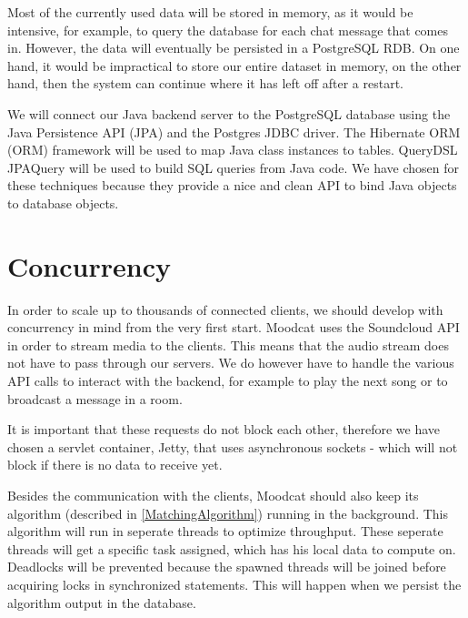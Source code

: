 \par
Most of the currently used data will be stored in memory, as it would be intensive, for example, to query the database for each chat message that comes in.
However, the data will eventually be persisted in a PostgreSQL\cite{PostgreSQL} \gls{RDB}.
On one hand, it would be impractical to store our entire dataset in memory, on the other hand, then the system can continue where it has left off after a restart.

\par
We will connect our Java backend server to the PostgreSQL database using the Java Persistence API (JPA) and the Postgres JDBC driver.
The Hibernate\cite{HibernateORM} \Gls{ORM} (ORM) framework will be used to map Java class instances to tables.
QueryDSL\cite{QueryDSL} JPAQuery will be used to build \Gls{SQL} queries from Java code.
We have chosen for these techniques because they provide a nice and clean API to bind Java objects to database objects.

\section{Concurrency}
In order to scale up to thousands of connected clients, we should develop with concurrency in mind from the very first start.
Moodcat uses the \gls{Soundcloud} API in order to stream media to the clients.
This means that the audio stream does not have to pass through our servers.
We do however have to handle the various API calls to interact with the backend, for example to play the next song or to broadcast a message in a room.

\par
It is important that these requests do not block each other, therefore we have chosen a servlet container, Jetty, that uses asynchronous sockets - which will not block if there is no data to receive yet.

\par
Besides the communication with the clients, Moodcat should also keep its algorithm (described in \ref{MatchingAlgorithm}) running in the background.
This algorithm will run in seperate threads to optimize throughput.
These seperate threads will get a specific task assigned, which has his local data to compute on.
Deadlocks will be prevented because the spawned threads will be joined before acquiring locks in synchronized statements.
This will happen when we persist the algorithm output in the database.

